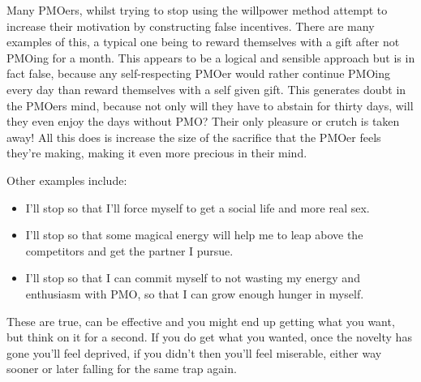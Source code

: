 \documentclass[easypeasy.tex]{subfiles}
\begin{document}
Many PMOers, whilst trying to stop using the willpower method attempt to increase their motivation by constructing false incentives. There are many examples of this, a typical one being to reward themselves with a gift after not PMOing for a month. This appears to be a logical and sensible approach but is in fact false, because any self-respecting PMOer would rather continue PMOing every day than reward themselves with a self given gift. This generates doubt in the PMOers mind, because not only will they have to abstain for thirty days, will they even enjoy the days without PMO? Their only pleasure or crutch is taken away! All this does is increase the size of the sacrifice that the PMOer feels they're making, making it even more precious in their mind.

Other examples include:
\begin{itemize}
  \item I'll stop so that I'll force myself to get a social life and more real sex.
  \item I'll stop so that some magical energy will help me to leap above the competitors and get the partner I pursue.
  \item I'll stop so that I can commit myself to not wasting my energy and enthusiasm with PMO, so that I can grow enough hunger in myself.
\end{itemize}

These are true, can be effective and you might end up getting what you want, but think on it for a second. If you do get what you wanted, once the novelty has gone you'll feel deprived, if you didn't then you'll feel miserable, either way sooner or later falling for the same trap again.
\end{document}
